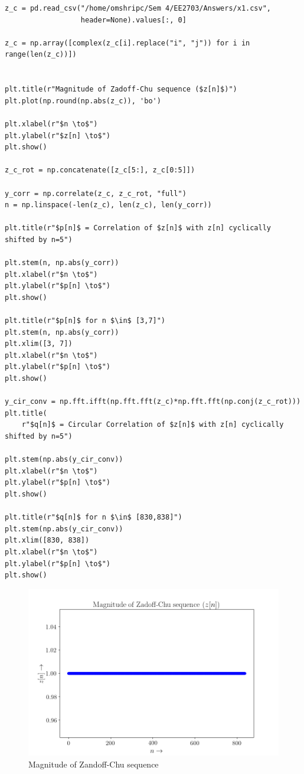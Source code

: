 \documentclass[11pt, a4paper]{article}
\begin{document}
\begin{lstlisting}
z_c = pd.read_csv("/home/omshripc/Sem 4/EE2703/Answers/x1.csv",
                  header=None).values[:, 0]

z_c = np.array([complex(z_c[i].replace("i", "j")) for i in range(len(z_c))])


plt.title(r"Magnitude of Zadoff-Chu sequence ($z[n]$)")
plt.plot(np.round(np.abs(z_c)), 'bo')

plt.xlabel(r"$n \to$")
plt.ylabel(r"$z[n] \to$")
plt.show()

z_c_rot = np.concatenate([z_c[5:], z_c[0:5]])

y_corr = np.correlate(z_c, z_c_rot, "full")
n = np.linspace(-len(z_c), len(z_c), len(y_corr))

plt.title(r"$p[n]$ = Correlation of $z[n]$ with z[n] cyclically shifted by n=5")

plt.stem(n, np.abs(y_corr))
plt.xlabel(r"$n \to$")
plt.ylabel(r"$p[n] \to$")
plt.show()

plt.title(r"$p[n]$ for n $\in$ [3,7]")
plt.stem(n, np.abs(y_corr))
plt.xlim([3, 7])
plt.xlabel(r"$n \to$")
plt.ylabel(r"$p[n] \to$")
plt.show()

y_cir_conv = np.fft.ifft(np.fft.fft(z_c)*np.fft.fft(np.conj(z_c_rot)))
plt.title(
    r"$q[n]$ = Circular Correlation of $z[n]$ with z[n] cyclically shifted by n=5")

plt.stem(np.abs(y_cir_conv))
plt.xlabel(r"$n \to$")
plt.ylabel(r"$p[n] \to$")
plt.show()

plt.title(r"$q[n]$ for n $\in$ [830,838]")
plt.stem(np.abs(y_cir_conv))
plt.xlim([830, 838])
plt.xlabel(r"$n \to$")
plt.ylabel(r"$p[n] \to$")
plt.show()
\end{lstlisting}
\newpage
\begin{figure}[!tbh]
  \centering
  \includegraphics[scale=0.6]{./../Extras/a10-12.png}  
  \caption{Magnitude of Zandoff-Chu sequence}
\end{figure}
\end{document}
